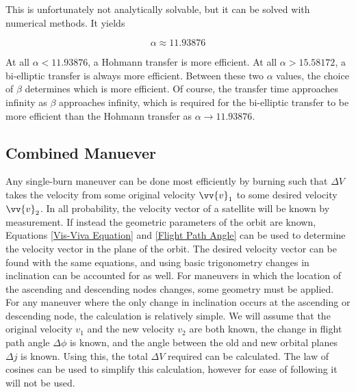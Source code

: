 \documentclass{article}
\begin{document}
This is unfortunately not analytically solvable, but it can be solved with numerical methods. It yields

$$\alpha\approx11.93876$$

At all $\alpha<11.93876$, a Hohmann transfer is more efficient. At all $\alpha>15.58172$, a bi-elliptic transfer is always more efficient. Between these two $\alpha$ values, the choice of $\beta$ determines which is more efficient. Of course, the transfer time approaches infinity as $\beta$ approaches infinity, which is required for the bi-elliptic transfer to be more efficient than the Hohmann transfer as $\alpha\rightarrow11.93876$.

\bigskip\bigskip
\subsection{Combined Manuever}

Any single-burn maneuver can be done most efficiently by burning such that $\Delta V$ takes the velocity from some original velocity $\vv{v}_1$ to some desired velocity $\vv{v}_2$. In all probability, the velocity vector of a satellite will be known by measurement. If instead the geometric parameters of the orbit are known, Equations \eqref{Vis-Viva Equation} and \eqref{Flight Path Angle} can be used to determine the velocity vector in the plane of the orbit. The desired velocity vector can be found with the same equations, and using basic trigonometry changes in inclination can be accounted for as well. For maneuvers in which the location of the ascending and descending nodes changes, some geometry must be applied. For any maneuver where the only change in inclination occurs at the ascending or descending node, the calculation is relatively simple. We will assume that the original velocity $v_1$ and the new velocity $v_2$ are both known, the change in flight path angle $\Delta \phi$ is known, and the angle between the old and new orbital planes $\Delta j$ is known. Using this, the total $\Delta V$ required can be calculated. The law of cosines can be used to simplify this calculation, however for ease of following it will not be used.
\end{document}
